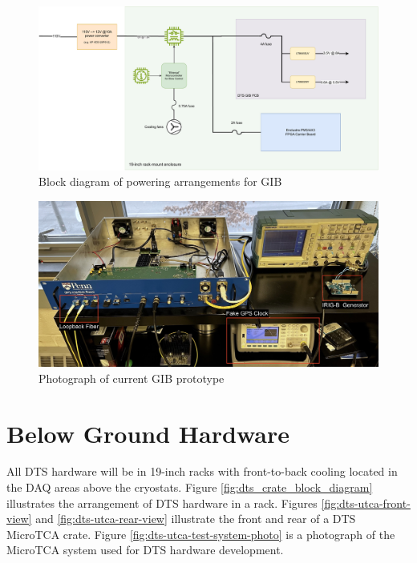 \documentclass[fleqn,12pt,a4paper]{olplainarticle}
\begin{document}
\begin{figure}[ht]
\centering
\includegraphics[width=\linewidth]{dts_gib_power_block_diagram_v1-231219.drawio.pdf}
\caption{Block diagram of powering arrangements for GIB}
\label{fig:dts_gib_power_block_diagram}
\end{figure}

\begin{figure}[ht]
\centering
\includegraphics[width=0.85\linewidth]{gib_teststand_setup_annotated.JPG}
\caption{Photograph of current GIB prototype}
\label{fig:dts_gibV1_photo}
\end{figure}

\section{Below Ground Hardware}

All DTS hardware will be in 19-inch racks with front-to-back cooling located in the DAQ areas above the cryostats. Figure \ref{fig:dts_crate_block_diagram} illustrates the arrangement of DTS hardware in a rack. Figures \ref{fig:dts-utca-front-view} and \ref{fig:dts-utca-rear-view} illustrate the front and rear of a DTS MicroTCA crate. Figure \ref{fig:dts-utca-test-system-photo} is a photograph of the MicroTCA system used for DTS hardware development.
\end{document}
